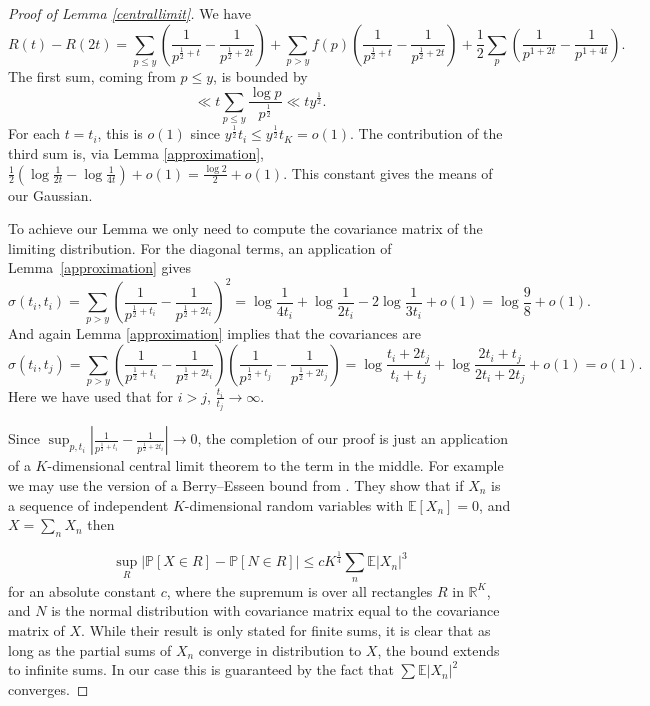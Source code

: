 \documentclass[12pt]{amsart}
\def\P{\mathbb P}
\def\E{\mathbb E}
\theoremstyle{remark}
\theoremstyle{definition}
\theoremstyle{remark}
\numberwithin{equation}{section}
\begin{document}
\begin{proof}[Proof of Lemma \ref{centrallimit}]
We have
    $$R(t)-R(2t) = \sum_{p \le y} \left(\frac{1}{p^{\frac{1}{2}+t}}-\frac{1}{p^{\frac{1}{2}+2t}}\right) + \sum_{p>y} f(p)\left(\frac{1}{p^{\frac{1}{2}+t}}-\frac{1}{p^{\frac{1}{2}+2t}}\right) +\frac{1}{2}\sum_{p}\left(\frac{1}{p^{1+2t}}-\frac{1}{p^{1+4t}}\right).$$
    The first sum, coming from $p \le y$, is bounded by 
    $$
    \ll t \sum_{p \le y} \frac{\log p}{p^{\frac{1}{2}}} \ll t y^{\frac{1}{2}}.$$
    For each $t = t_i$, this is $o(1)$ since $y^{\frac{1}{2}} t_i \le y^{\frac{1}{2}} t_K= o(1)$.
    The contribution of the third sum is, via Lemma \ref{approximation}, 
    $\frac{1}{2} (\log\frac{1}{2t} - \log\frac{1}{4t}) + o(1) = \frac{\log 2}{2} + o(1)$. This constant gives the means of our Gaussian. 
    
    To achieve our Lemma we only need to compute the covariance matrix of the limiting distribution. For the diagonal terms, an application of Lemma~\ref{approximation} gives $$\sigma(t_i,t_i) = \sum_{p>y} \left(\frac{1}{p^{\frac{1}{2}+t_i}}-\frac{1}{p^{\frac{1}{2}+2t_i}}\right)^2 = \log\frac{1}{4t_i} + \log\frac{1}{2t_i}-2 \log \frac{1}{3t_i}+o(1) = \log\frac{9}{8} + o(1).$$
    And again Lemma \ref{approximation} implies that the covariances are
    \begin{equation}\label{eqn: covariance}
       \sigma(t_i,t_j) = \sum_{p>y} \left(\frac{1}{p^{\frac{1}{2}+t_i}}-\frac{1}{p^{\frac{1}{2}+2t_i}}\right)\left(\frac{1}{p^{\frac{1}{2}+t_j}}-\frac{1}{p^{\frac{1}{2}+2t_j}}\right) = \log \frac{t_i+2t_j}{t_i+t_j}+\log\frac{2t_i+t_j}{2t_i+2t_j}+o(1)=o(1). 
    \end{equation}
   Here we have used that for $i>j$, $\frac{t_i}{t_j} \rightarrow \infty$.
   
    Since $\sup_{p, t_i}\left| \frac{1}{p^{\frac{1}{2}+t_i}}-\frac{1}{p^{\frac{1}{2}+2t_i}}\right|\rightarrow 0$, the completion of our proof is just an application of a $K$-dimensional central limit theorem to the term in the middle. For example we may use the version of a Berry--Esseen bound from \cite{lyapunovbound}. They show that if $X_n$ is a sequence of independent $K$-dimensional random variables with $\E[X_n] = 0$, and $X = \sum_n X_n$ then 
    
    $$\sup_{R} |\P[X \in R] - \P[N \in R]| \le cK^{\frac{1}{4}} \sum_{n} \E|X_n|^3$$
    for an absolute constant $c$, where the supremum is over all rectangles $R$ in $\mathbb{R}^K$, and $N$ is the normal distribution with covariance matrix equal to the covariance matrix of $X$. While their result is only stated for finite sums, it is clear that as long as the partial sums of $X_n$ converge in distribution to $X$, the bound extends to infinite sums. In our case this is guaranteed by the fact that $\sum \E|X_n|^2$ converges.


\end{proof}
\end{document}
